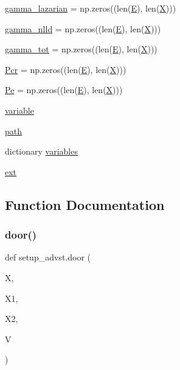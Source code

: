 \begin{DoxyCompactItemize}
\item 
\hyperlink{namespacesetup__advst_a3a52a708bec865ad7e2870dcb87c8b12}{gamma\+\_\+lazarian} = np.\+zeros((len(\hyperlink{namespacesetup__advst_a846b33b3abeae0f60876a6d51bb0ae79}{E}), len(\hyperlink{namespacesetup__advst_a4fe22219bfc7363b6decb33a0885e17a}{X})))
\item 
\hyperlink{namespacesetup__advst_a4accec19b6a4bd05f7fce83a95449ef5}{gamma\+\_\+nlld} = np.\+zeros((len(\hyperlink{namespacesetup__advst_a846b33b3abeae0f60876a6d51bb0ae79}{E}), len(\hyperlink{namespacesetup__advst_a4fe22219bfc7363b6decb33a0885e17a}{X})))
\item 
\hyperlink{namespacesetup__advst_a7a54cdfe0e3e420aba1cee08e8612a06}{gamma\+\_\+tot} = np.\+zeros((len(\hyperlink{namespacesetup__advst_a846b33b3abeae0f60876a6d51bb0ae79}{E}), len(\hyperlink{namespacesetup__advst_a4fe22219bfc7363b6decb33a0885e17a}{X})))
\item 
\hyperlink{namespacesetup__advst_a8644074ca2fbad195ca981d15c8a711d}{Pcr} = np.\+zeros((len(\hyperlink{namespacesetup__advst_a846b33b3abeae0f60876a6d51bb0ae79}{E}), len(\hyperlink{namespacesetup__advst_a4fe22219bfc7363b6decb33a0885e17a}{X})))
\item 
\hyperlink{namespacesetup__advst_a25edc171dc71b8c313e1766015540dd1}{Pe} = np.\+zeros((len(\hyperlink{namespacesetup__advst_a846b33b3abeae0f60876a6d51bb0ae79}{E}), len(\hyperlink{namespacesetup__advst_a4fe22219bfc7363b6decb33a0885e17a}{X})))
\item 
\hyperlink{namespacesetup__advst_accf27102e4466c3240cb0b31b81f75fc}{variable}
\item 
\hyperlink{namespacesetup__advst_afcf8bfc1996ec2ad8d8472657a384e88}{path}
\item 
dictionary \hyperlink{namespacesetup__advst_af3d23bdaf5ca52065b92312151d23e4b}{variables}
\item 
\hyperlink{namespacesetup__advst_a0df92a2ca2d62e842315a8f97ef341d0}{ext}
\end{DoxyCompactItemize}


\subsection{Function Documentation}
\mbox{\label{namespacesetup__advst_a5ca2de035f76d55b884417b6ed9191d4}} 
\subsubsection{\texorpdfstring{door()}{door()}}
{\footnotesize\ttfamily def setup\+\_\+advst.\+door (\begin{DoxyParamCaption}\item[{}]{X,  }\item[{}]{X1,  }\item[{}]{X2,  }\item[{}]{V }\end{DoxyParamCaption})}

